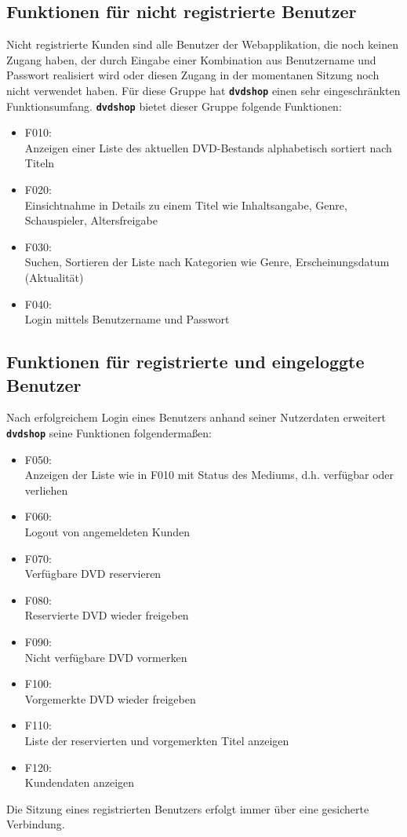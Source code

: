 \documentclass[12pt,oneside,a4paper,bibtotoc,liststotoc,pointlessnumbers]{scrartcl}
\begin{document}
\subsection{Funktionen für nicht registrierte Benutzer}
Nicht registrierte Kunden sind alle Benutzer der Webapplikation, die noch keinen Zugang haben, der durch Eingabe einer Kombination aus Benutzername und Passwort realisiert wird oder diesen Zugang in der momentanen Sitzung noch nicht verwendet haben. Für diese Gruppe hat \texttt{\textbf{dvdshop}} einen sehr eingeschränkten Funktionsumfang. \texttt{\textbf{dvdshop}} bietet dieser Gruppe folgende Funktionen:
\begin{itemize}
\item F010: \\Anzeigen einer Liste des aktuellen DVD-Bestands alphabetisch sortiert nach Titeln
\item F020: \\ Einsichtnahme in Details zu einem Titel wie Inhaltsangabe, Genre, Schauspieler, Altersfreigabe
\item F030: \\Suchen, Sortieren der Liste nach Kategorien wie Genre, Erscheinungsdatum (Aktualität)
\item F040: \\Login mittels Benutzername und Passwort
\end{itemize}
\newpage
\subsection{Funktionen für registrierte und eingeloggte Benutzer}
Nach erfolgreichem Login eines Benutzers anhand seiner Nutzerdaten erweitert \texttt{\textbf{dvdshop}} seine Funktionen folgendermaßen:
\begin{itemize}
\item F050: \\Anzeigen der Liste wie in F010 mit Status des Mediums, d.h. verfügbar oder verliehen
\item F060: \\Logout von angemeldeten Kunden
\item F070: \\Verfügbare DVD reservieren
\item F080: \\Reservierte DVD wieder freigeben
\item F090: \\Nicht verfügbare DVD vormerken
\item F100: \\Vorgemerkte DVD wieder freigeben
\item F110: \\Liste der reservierten und vorgemerkten Titel anzeigen
\item F120: \\Kundendaten anzeigen
\end{itemize}
Die Sitzung eines registrierten Benutzers erfolgt immer über eine gesicherte Verbindung.
\end{document}
